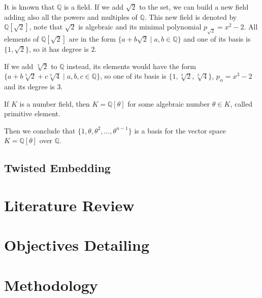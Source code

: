 \documentclass[Ingles]{ic-tese-v3}
\begin{document}
\begin{example}
  It is known that $\mathbb{Q}$ is a field. If we add $\sqrt{2}$ to the set, we
  can build a new field adding also all the powers and multiples of
  $\mathbb{Q}$. This new field is denoted by $\mathbb{Q}[\sqrt{2}]$, note that
  $\sqrt{2}$ is algebraic and its minimal polynomial $p_{\sqrt{2}} = x^2-2$. All
  elements of $\mathbb{Q}[\sqrt{2}]$ are in the form $\{a+b\sqrt{2} \;|\; a,b \in
  \mathbb{Q}\}$ and one of its basis is $\{1, \sqrt{2}\}$, so it has degree is
  $2$.
\end{example}

\begin{example}
  If we add $\sqrt[3]{2}$ to $\mathbb{Q}$ instead, its elements would have the
  form $\{a + b\sqrt[3]{2} + c\sqrt[3]{4} \;|\; a,b,c \in \mathbb{Q}\}$, so one of
  its basis is $\{1 ,\sqrt[3]{2} ,\sqrt[3]{4}\}$, $p_\alpha = x^3 - 2$ and its degree
  is $3$.
\end{example}

\begin{theorem}
   If $K$ is a number field, then $K = \mathbb{Q}[\theta]$ for some
  algebraic number $\theta \in K$, called primitive element.
\end{theorem}

Then we conclude that \(\{1, \theta, \theta^2, ... , \theta^{n-1}\}\) is a basis for the vector
space \(K = \mathbb{Q}[\theta]\) over \(\mathbb{Q}\).

\section{Twisted Embedding}
\label{sec:org052db5b}

\chapter{Literature Review}
\label{sec:orgd36839f}

\chapter{Objectives Detailing}
\label{sec:org5eb7f60}

\chapter{Methodology}
\label{sec:orgf5dabcd}



\end{document}
